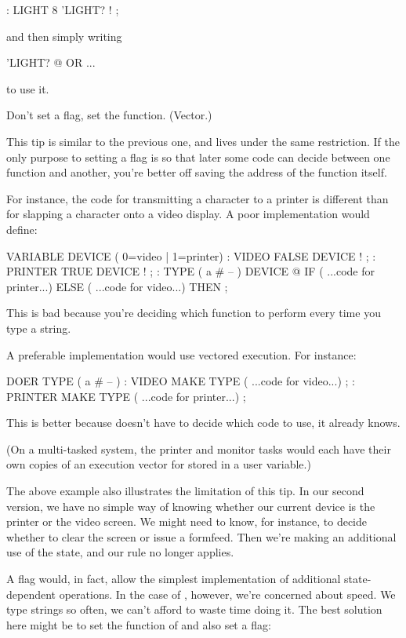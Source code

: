 \begin{Code}
: LIGHT   8 'LIGHT? ! ;
\end{Code}
and then simply writing

\begin{Code}
'LIGHT? @  OR ...
\end{Code}
to use it.

\begin{tip}
Don't set a flag, set the function. (Vector.)
\end{tip}
This tip is similar to the previous one, and lives under the same
restriction. If the only purpose to setting a flag is so that later some
code can decide between one function and another, you're better off saving
the address of the function itself.

For instance, the code for transmitting a character to a printer is
different than for slapping a character onto a video display. A poor
implementation would define:

\begin{Code}
VARIABLE DEVICE  ( 0=video | 1=printer)
: VIDEO   FALSE DEVICE ! ;
: PRINTER   TRUE DEVICE ! ;
: TYPE  ( a # -- ) DEVICE @ IF
   ( ...code for printer...) ELSE
   ( ...code for video...)  THEN ;
\end{Code}
This is bad because you're deciding which function to perform every time
you type a string.

A preferable implementation would use vectored execution. For
instance:

\begin{Code}
DOER TYPE  ( a # -- )
: VIDEO   MAKE TYPE ( ...code for video...) ;
: PRINTER   MAKE TYPE ( ...code for printer...) ;
\end{Code}
This is better because  doesn't have to decide which code to
use, it already knows.

(On a multi-tasked system, the printer and monitor tasks would
each have their own copies of an execution vector for 
stored in a user variable.)

The above example also illustrates the limitation of this tip. In our
second version, we have no simple way of knowing whether our current
device is the printer or the video screen. We might need to know, for
instance, to decide whether to clear the screen or issue a formfeed. Then
we're making an additional use of the state, and our rule no longer
applies.

A flag would, in fact, allow the simplest implementation of additional
state-dependent operations. In the case of , however, we're
concerned about speed. We type strings so often, we can't afford to waste
time doing it. The best solution here might be to set the function of
 and also set a flag:

